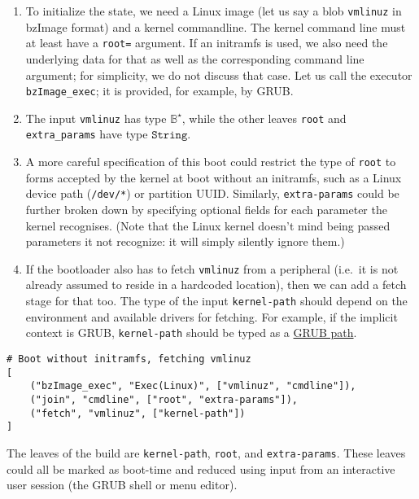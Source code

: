 \begin{enumerate}
\def\labelenumi{\arabic{enumi}.}
\tightlist
\item
  To initialize the state, we need a Linux image (let us say a blob
  \texttt{vmlinuz} in bzImage format) and a kernel commandline. The
  kernel command line must at least have a \texttt{root=} argument. If
  an initramfs is used, we also need the underlying data for that as
  well as the corresponding command line argument; for simplicity, we do
  not discuss that case. Let us call the executor
  \texttt{bzImage\_exec}; it is provided, for example, by GRUB.
\item
  The input \texttt{vmlinuz} has type \(\mathbb{B}^\star\), while the
  other leaves \texttt{root} and \texttt{extra\_params} have type
  \(\mathtt{String}\).
\item
  A more careful specification of this boot could restrict the type of
  \texttt{root} to forms accepted by the kernel at boot without an
  initramfs, such as a Linux device path (\texttt{/dev/*}) or partition
  UUID. Similarly, \texttt{extra-params} could be further broken down by
  specifying optional fields for each parameter the kernel recognises.
  (Note that the Linux kernel doesn't mind being passed parameters it
  not recognize: it will simply silently ignore them.)
\item
  If the bootloader also has to fetch \texttt{vmlinuz} from a peripheral
  (i.e.~it is not already assumed to reside in a hardcoded location),
  then we can add a fetch stage for that too. The type of the input
  \texttt{kernel-path} should depend on the environment and available
  drivers for fetching. For example, if the implicit context is GRUB,
  \texttt{kernel-path} should be typed as a
  \href{https://www.gnu.org/software/grub/manual/grub/grub.html\#Naming-convention}{GRUB
  path}.
\end{enumerate}

\begin{verbatim}
# Boot without initramfs, fetching vmlinuz
[
    ("bzImage_exec", "Exec(Linux)", ["vmlinuz", "cmdline"]),
    ("join", "cmdline", ["root", "extra-params"]),
    ("fetch", "vmlinuz", ["kernel-path"])
]
\end{verbatim}

The leaves of the build are \texttt{kernel-path}, \texttt{root}, and
\texttt{extra-params}. These leaves could all be marked as boot-time and
reduced using input from an interactive user session (the GRUB shell or
menu editor).

